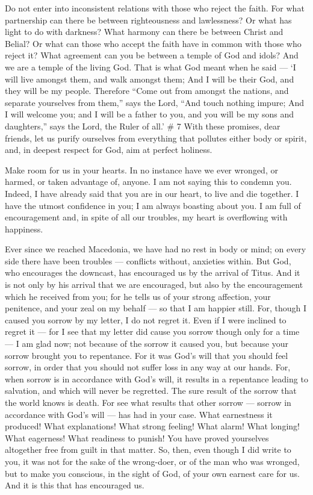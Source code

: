  Do not enter into inconsistent relations with those who
reject the faith. For what partnership can there be between
righteousness and lawlessness? Or what has light to do with darkness?
 What harmony can there be between Christ and Belial? Or
what can those who accept the faith have in common with those who reject
it?  What agreement can you be between a temple of God and
idols? And we are a temple of the living God. That is what God meant
when he said --- `I will live amongst them, and walk amongst them; And I
will be their God, and they will be my people.  Therefore
``Come out from amongst the nations, and separate yourselves from
them,'' says the Lord, ``And touch nothing impure; And I will welcome
you;  and I will be a father to you, and you will be my
sons and daughters,'' says the Lord, the Ruler of all.' \# 7
 With these promises, dear friends, let us purify ourselves
from everything that pollutes either body or spirit, and, in deepest
respect for God, aim at perfect holiness.

 Make room for us in your hearts. In no instance have we
ever wronged, or harmed, or taken advantage of, anyone.  I
am not saying this to condemn you. Indeed, I have already said that you
are in our heart, to live and die together.  I have the
utmost confidence in you; I am always boasting about you. I am full of
encouragement and, in spite of all our troubles, my heart is overflowing
with happiness.

 Ever since we reached Macedonia, we have had no rest in
body or mind; on every side there have been troubles --- conflicts
without, anxieties within.  But God, who encourages the
downcast, has encouraged us by the arrival of Titus.  And it
is not only by his arrival that we are encouraged, but also by the
encouragement which he received from you; for he tells us of your strong
affection, your penitence, and your zeal on my behalf --- so that I am
happier still.  For, though I caused you sorrow by my
letter, I do not regret it. Even if I were inclined to regret it --- for
I see that my letter did cause you sorrow though only for a time ---
 I am glad now; not because of the sorrow it caused you, but
because your sorrow brought you to repentance. For it was God's will
that you should feel sorrow, in order that you should not suffer loss in
any way at our hands.  For, when sorrow is in accordance
with God's will, it results in a repentance leading to salvation, and
which will never be regretted. The sure result of the sorrow that the
world knows is death.  For see what results that other
sorrow --- sorrow in accordance with God's will --- has had in your
case. What earnestness it produced! What explanations! What strong
feeling! What alarm! What longing! What eagerness! What readiness to
punish! You have proved yourselves altogether free from guilt in that
matter.  So, then, even though I did write to you, it was
not for the sake of the wrong-doer, or of the man who was wronged, but
to make you conscious, in the sight of God, of your own earnest care for
us. And it is this that has encouraged us.

